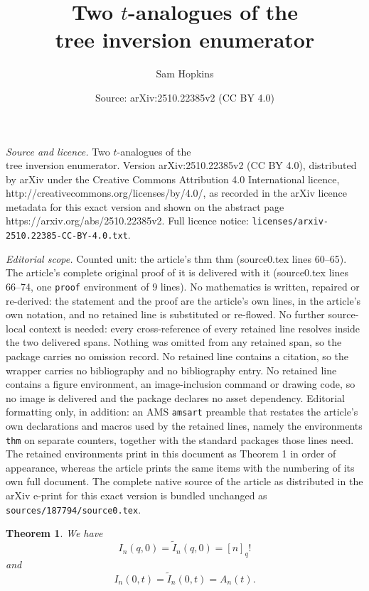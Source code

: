 \documentclass[10pt,a4paper]{amsart}
\title{Two $t$-analogues of the\\ tree inversion enumerator}
\author{Sam Hopkins}
\date{Source: arXiv:2510.22385v2 (CC BY 4.0)}
\newtheorem{thm}{Theorem}
\begin{document}
\maketitle

\noindent\emph{Source and licence.} Two $t$-analogues of the\\ tree inversion enumerator. Version arXiv:2510.22385v2 (CC BY 4.0), distributed by arXiv under the Creative Commons Attribution 4.0 International licence, http://creativecommons.org/licenses/by/4.0/, as recorded in the arXiv licence metadata for this exact version and shown on the abstract page https://arxiv.org/abs/2510.22385v2. Full licence notice: \texttt{licenses/arxiv-2510.22385-CC-BY-4.0.txt}.\par\smallskip

\noindent\textit{Editorial scope.} Counted unit: the article's thm thm (source0.tex lines 60--65). The article's complete original proof of it is delivered with it (source0.tex lines 66--74, one \texttt{proof} environment of 9 lines). No mathematics is written, repaired or re-derived: the statement and the proof are the article's own lines, in the article's own notation, and no retained line is substituted or re-flowed.  No further source-local context is needed: every cross-reference of every retained line resolves inside the two delivered spans.  Nothing was omitted from any retained span, so the package carries no omission record.  No retained line contains a citation, so the wrapper carries no bibliography and no bibliography entry.  No retained line contains a figure environment, an image-inclusion command or drawing code, so no image is delivered and the package declares no asset dependency.  Editorial formatting only, in addition: an AMS \texttt{amsart} preamble that restates the article's own declarations and macros used by the retained lines, namely the environments \texttt{thm} on separate counters, together with the standard packages those lines need.  The retained environments print in this document as Theorem 1 in order of appearance, whereas the article prints the same items with the numbering of its own full document.  The complete native source of the article as distributed in the arXiv e-print for this exact version is bundled unchanged as \texttt{sources/187794/source0.tex}.
\begin{thm}
We have
\[I_n(q,0)=\widetilde{I}_n(q,0)= [n]_q!\]
and
\[I_n(0,t)=\widetilde{I}_n(0,t) = A_n(t).\]
\end{thm}
\end{document}
